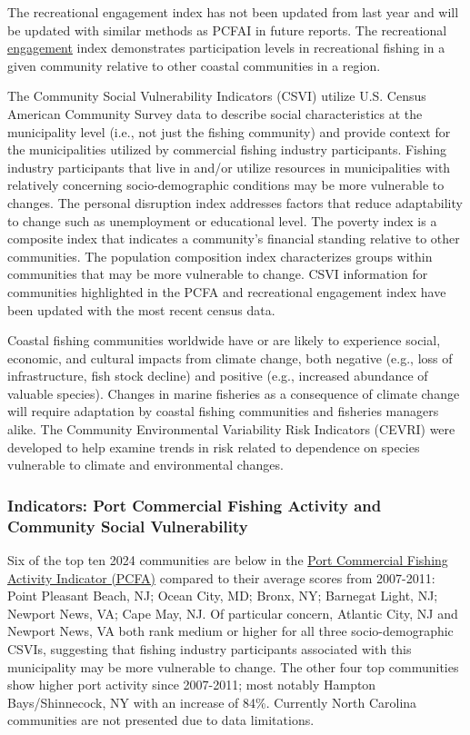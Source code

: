 \documentclass[
  10pt,
]{article}
\begin{document}
The recreational engagement index has not been updated from last year and will be updated with similar methods as PCFAI in future reports. The recreational \href{https://noaa-edab.github.io/catalog/engagement.html}{engagement} index demonstrates participation levels in recreational fishing in a given community relative to other coastal communities in a region.

The Community Social Vulnerability Indicators (CSVI) utilize U.S. Census American Community Survey data to describe social characteristics at the municipality level (i.e., not just the fishing community) and provide context for the municipalities utilized by commercial fishing industry participants. Fishing industry participants that live in and/or utilize resources in municipalities with relatively concerning socio-demographic conditions may be more vulnerable to changes. The personal disruption index addresses factors that reduce adaptability to change such as unemployment or educational level. The poverty index is a composite index that indicates a community's financial standing relative to other communities. The population composition index characterizes groups within communities that may be more vulnerable to change. CSVI information for communities highlighted in the PCFA and recreational engagement index have been updated with the most recent census data.

Coastal fishing communities worldwide have or are likely to experience social, economic, and cultural impacts from climate change, both negative (e.g., loss of infrastructure, fish stock decline) and positive (e.g., increased abundance of valuable species). Changes in marine fisheries as a consequence of climate change will require adaptation by coastal fishing communities and fisheries managers alike. The Community Environmental Variability Risk Indicators (CEVRI) were developed to help examine trends in risk related to dependence on species vulnerable to climate and environmental changes.

\subsubsection{Indicators: Port Commercial Fishing Activity and Community Social Vulnerability}\label{indicators-port-commercial-fishing-activity-and-community-social-vulnerability}

Six of the top ten 2024 communities are below in the \href{https://noaa-edab.github.io/catalog/engagement.html?q=engage\#introduction-to-indicator-72}{Port Commercial Fishing Activity Indicator (PCFA)} compared to their average scores from 2007-2011: Point Pleasant Beach, NJ; Ocean City, MD; Bronx, NY; Barnegat Light, NJ; Newport News, VA; Cape May, NJ. Of particular concern, Atlantic City, NJ and Newport News, VA both rank medium or higher for all three socio-demographic CSVIs, suggesting that fishing industry participants associated with this municipality may be more vulnerable to change. The other four top communities show higher port activity since 2007-2011; most notably Hampton Bays/Shinnecock, NY with an increase of 84\%. Currently North Carolina communities are not presented due to data limitations.
\end{document}
